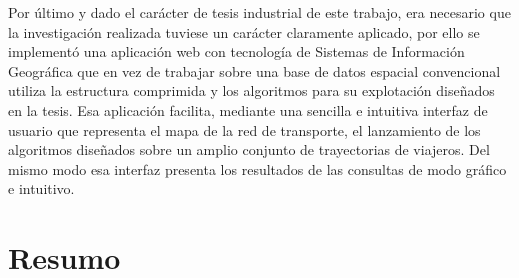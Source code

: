Por \'ultimo y dado el car\'acter de tesis industrial de este trabajo, era necesario que la investigaci\'on realizada tuviese un car\'acter claramente aplicado, por ello se implement\'o una aplicaci\'on web con tecnolog\'ia de Sistemas de Informaci\'on Geogr\'afica que en vez de trabajar sobre una base de datos espacial convencional utiliza la estructura comprimida y los algoritmos para su explotaci\'on dise\~nados en la tesis. Esa aplicaci\'on facilita, mediante una sencilla e intuitiva interfaz de usuario que representa el mapa de la red de transporte, el lanzamiento de los algoritmos dise\~nados sobre un amplio conjunto de trayectorias de viajeros. Del mismo modo esa interfaz presenta los resultados de las consultas de modo gr\'afico e intuitivo.

\chapter*{Resumo}

